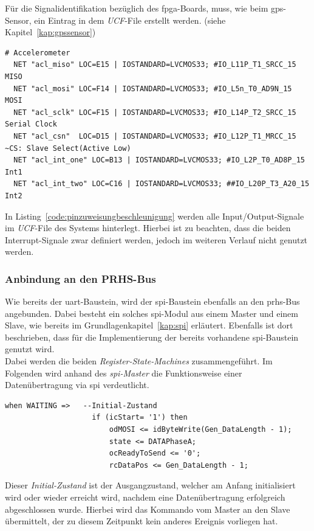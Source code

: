 Für die Signalidentifikation bezüglich des \ac{fpga}-Boards, muss, wie beim \ac{gps}-Sensor, ein Eintrag in dem \emph{UCF}-File erstellt werden.
(siehe Kapitel~\ref{kap:gpssensor})\\
\begin{lstlisting}[caption={Beschleunigungssensor Pinzuweisung innerhalb des \emph{UCF}-Files},label={code:pinzuweisungbeschleunigung}]
  # Accelerometer
  NET "acl_miso" LOC=E15 | IOSTANDARD=LVCMOS33; #IO_L11P_T1_SRCC_15 MISO
  NET "acl_mosi" LOC=F14 | IOSTANDARD=LVCMOS33; #IO_L5n_T0_AD9N_15 MOSI
  NET "acl_sclk" LOC=F15 | IOSTANDARD=LVCMOS33; #IO_L14P_T2_SRCC_15 Serial Clock
  NET "acl_csn"  LOC=D15 | IOSTANDARD=LVCMOS33; #IO_L12P_T1_MRCC_15 ~CS: Slave Select(Active Low)
  NET "acl_int_one" LOC=B13 | IOSTANDARD=LVCMOS33; #IO_L2P_T0_AD8P_15 Int1
  NET "acl_int_two" LOC=C16 | IOSTANDARD=LVCMOS33; ##IO_L20P_T3_A20_15 Int2
\end{lstlisting}

 In Listing~\ref{code:pinzuweisungbeschleunigung} werden alle Input/Output-Signale im \emph{UCF}-File des Systems hinterlegt.
 Hierbei ist zu beachten, dass die beiden Interrupt-Signale zwar definiert werden, jedoch im weiteren Verlauf nicht
 genutzt werden.

 \subsubsection{Anbindung an den PRHS-Bus}\label{kap:Anbindungbeschleunigung}

 Wie bereits der \ac{uart}-Baustein, wird der \ac{spi}-Baustein ebenfalls an den \ac{prhs}-Bus angebunden.
 Dabei besteht ein solches \ac{spi}-Modul aus einem Master und einem Slave, wie bereits
 im Grundlagenkapitel~\ref{kap:spi} erläutert. Ebenfalls ist dort beschrieben, dass für die Implementierung
 der bereits vorhandene \ac{spi}-Baustein genutzt wird. \\
 Dabei werden die beiden \emph{Register-State-Machines} zusammengeführt. Im Folgenden wird anhand des \emph{\ac{spi}-Master}
 die Funktionsweise einer Datenübertragung via \ac{spi} verdeutlicht.\\

 \begin{lstlisting}[caption={Initialzustand des \ac{spi}-Master RSM},label={code:waitingspimaster}]
   when WAITING =>   --Initial-Zustand
	                if (icStart= '1') then
	                    odMOSI <= idByteWrite(Gen_DataLength - 1);
	                    state <= DATAPhaseA;
	                    ocReadyToSend <= '0';
	                    rcDataPos <= Gen_DataLength - 1;
  \end{lstlisting}
    Dieser \emph{Initial-Zustand} ist der Ausgangzustand, welcher am Anfang initialisiert wird oder wieder erreicht
    wird, nachdem eine Datenübertragung erfolgreich abgeschlossen wurde. Hierbei wird das Kommando vom Master an
    den Slave übermittelt, der zu diesem Zeitpunkt kein anderes Ereignis vorliegen hat.\\

